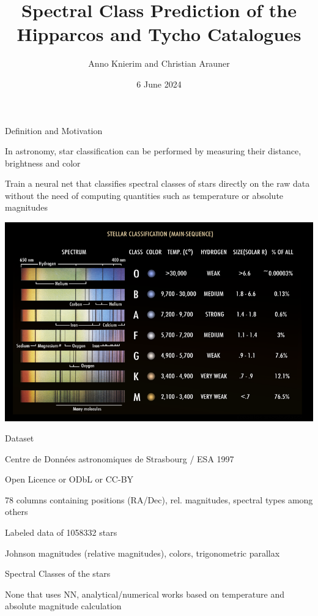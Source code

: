 \documentclass[aspectratio=1610, 9pt]{beamer}
\title{Spectral Class Prediction of the Hipparcos and Tycho Catalogues}
\author[A.~Knierim and C.~Arauner]{Anno Knierim and Christian Arauner}
\date{6 June 2024}
\begin{document}
\maketitle

  \begin{frame}{Definition and Motivation}
    \begin{minipage}{0.48\textwidth}
    \begin{description}
      \setlength{\itemsep}{2em}
      \item[Motivation] In astronomy, star classification can be performed by measuring their distance, brightness and color
      \item[Goal] Train a neural net that classifies spectral classes of stars directly on the raw data without the need of computing
        quantities such as temperature or absolute magnitudes
    \end{description}
    \end{minipage}
    \hfill%
    \begin{minipage}{0.48\textwidth}
      \includegraphics[width=\textwidth]{images/Stellar_Classification_Chart.png}
      {\tiny {}}
    \end{minipage}
  \end{frame}
  \begin{frame}{Dataset}
    \begin{description}
      \setlength{\itemsep}{2em}
      \item[Source] Centre de Données astronomiques de Strasbourg / ESA 1997
      \item[Licence] Open Licence or ODbL or CC-BY
      \item[Information] 78 columns containing positions (RA/Dec), rel. magnitudes, spectral types among others
      \item[Entries] Labeled data of \num{1058332} stars
      \item[Useful Features] Johnson magnitudes (relative magnitudes), colors, trigonometric parallax
      \item[Target variable] Spectral Classes of the stars
      \item[Previous Work] None that uses NN, analytical/numerical works based on temperature and absolute magnitude calculation
    \end{description}
  \end{frame}
\end{document}
